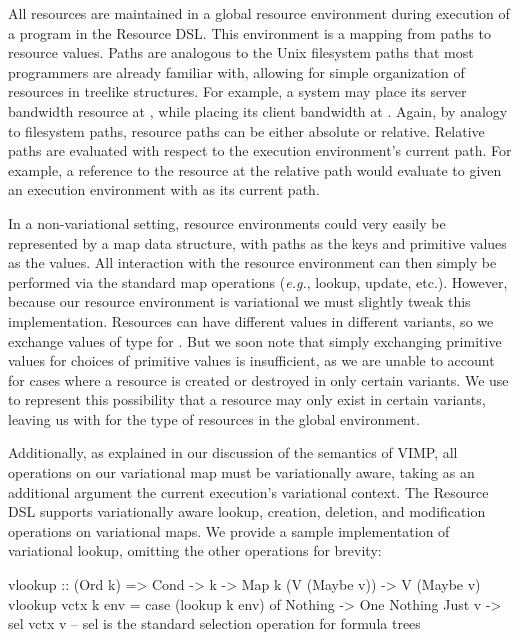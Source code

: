 \documentclass[letterpaper,10pt,onecolumn]{article}
\begin{document}
All resources are maintained in a global resource environment during execution of a program
in the Resource DSL. This environment is a mapping from paths to resource values. Paths are
analogous to the Unix filesystem paths that most programmers are already familiar with, allowing for
simple organization of resources in treelike structures. For example, a system may place its server
bandwidth resource at , while placing its client bandwidth at .
Again, by analogy to filesystem paths, resource paths can be either absolute or relative. Relative paths are
evaluated with respect to the execution environment's current path. For example, a reference to the resource
at the relative path  would evaluate to 
given an execution environment with  as its current path.

In a non-variational setting, resource environments could very easily be represented by a map data structure,
with paths as the keys and primitive values as the values. All interaction with the resource environment can then
simply be performed via the standard map operations (\emph{e.g.}, lookup, update, etc.). However, because our resource environment
is variational we must slightly tweak this implementation. Resources can have different values in different
variants, so we exchange values of type  for . But we soon note that simply exchanging primitive values
for choices of primitive values is insufficient, as we are unable to
account for cases where a resource is created or destroyed in only certain variants. We use  to represent this possibility
that a resource may only exist in certain variants, leaving us with  for the type of resources in the global environment.

Additionally, as explained in our discussion of the semantics of VIMP, all operations on our variational map must be variationally aware,
taking as an additional argument the current execution's variational context. The Resource DSL supports variationally aware lookup,
creation, deletion, and modification operations on variational maps. We provide a sample implementation of variational lookup, omitting
the other operations for brevity:

\begin{program}
vlookup :: (Ord k) => Cond -> k -> Map k (V (Maybe v)) -> V (Maybe v)
vlookup vctx k env = case (lookup k env) of
    Nothing -> One Nothing
    Just v -> sel vctx v  -- sel is the standard selection operation for formula trees
\end{program}
\end{document}
